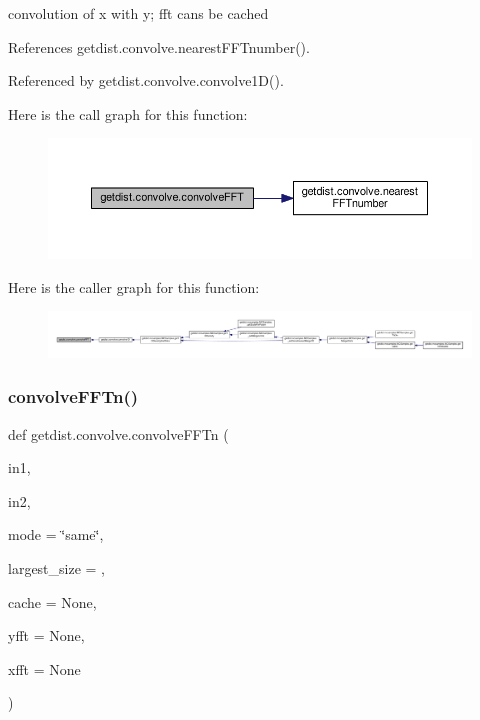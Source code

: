 \begin{DoxyVerb}convolution of x with y; fft cans be cached
\end{DoxyVerb}
 

References getdist.\+convolve.\+nearest\+F\+F\+Tnumber().



Referenced by getdist.\+convolve.\+convolve1\+D().

Here is the call graph for this function\+:
\nopagebreak
\begin{figure}[H]
\begin{center}
\leavevmode
\includegraphics[width=350pt]{namespacegetdist_1_1convolve_af08ac2f6f2680fe66589162631d5d9ba_cgraph}
\end{center}
\end{figure}
Here is the caller graph for this function\+:
\nopagebreak
\begin{figure}[H]
\begin{center}
\leavevmode
\includegraphics[width=350pt]{namespacegetdist_1_1convolve_af08ac2f6f2680fe66589162631d5d9ba_icgraph}
\end{center}
\end{figure}
\mbox{\label{namespacegetdist_1_1convolve_a72fc3a89b0f824b66fc4e547a0783bdc}} 
\subsubsection{\texorpdfstring{convolve\+F\+F\+Tn()}{convolveFFTn()}}
{\footnotesize\ttfamily def getdist.\+convolve.\+convolve\+F\+F\+Tn (\begin{DoxyParamCaption}\item[{}]{in1,  }\item[{}]{in2,  }\item[{}]{mode = {\ttfamily \char`\"{}same\char`\"{}},  }\item[{}]{largest\+\_\+size = {},  }\item[{}]{cache = {\ttfamily None},  }\item[{}]{yfft = {\ttfamily None},  }\item[{}]{xfft = {\ttfamily None} }\end{DoxyParamCaption})}



